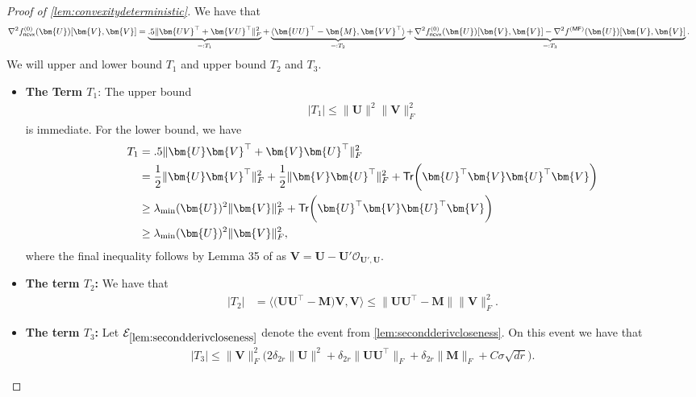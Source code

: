 \documentclass[10pt]{article}
\renewcommand{\t}{^{\top}}
\theoremstyle{definition}
\begin{document}
\begin{proof}[Proof of \cref{lem:convexitydeterministic}]
  We have that 
   \begin{align}
       \nabla^2 f^{(0)}_{{\sf ncvx}}(\bm{U})[\bm{V}, \bm{V}] &= \underbrace{ .5\| \bm{UV}\t + \bm{VU}\t \|_F^2 }_{=:T_1} + \underbrace{ \langle \bm{UU}\t - \bm{M}, \bm{VV}\t\rangle}_{=:T_2} + 
       \underbrace{\nabla^2 f^{(0)}_{{\sf ncvx}}(\bm{U})[ \bm{V},\bm{V}] - \nabla^2 f^{{(\sf MF)}}(\bm{U})[\bm{V},\bm{V}]}_{=:T_3}.
   \end{align}
We will upper and lower bound $T_1$ and upper bound $T_2$ and $T_3$.  
\begin{itemize}
    \item \textbf{The Term $T_1$}: The upper bound 
    \begin{align}
        |T_1| \leq \| \bm{U} \|^2 \| \bm{V} \|_F^2
    \end{align}
    is immediate.  For the lower bound, we have
    \begin{align}
         T_1 &= .5 \| \bm{U} \bm{V}\t + \bm{V} \bm{U}^{\top} \|_F^2 \\
        &= \frac{1}{2} \| \bm{U} \bm{V}\t \|_F^2 + \frac{1}{2} \| \bm{V} \bm{U}^{\top} \|_F^2 + {\sf Tr}\bigg( \bm{U}^{\top} \bm{V} \bm{U}^{\top} \bm{V} \bigg) \\
        &\geq \lambda_{\min}(\bm{U})^2 \| \bm{V} \|_F^2 + {\sf Tr}\bigg( \bm{U}^{\top} \bm{V} \bm{U}^{\top} \bm{V} \bigg) \\
        &\geq \lambda_{\min}(\bm{U})^2 \| \bm{V} \|_F^2,
    \end{align}
    where the final inequality follows by Lemma 35 of \citet{ma_implicit_2020} as $\bm{V} = \bm{U} - \bm{U}' \mathcal{O}_{\bm{U}',\bm{U}}$.
    \item \textbf{The term $T_2$: } We have that
    \begin{align}
        |T_2| &= \langle \big(\bm{UU}\t - \bm{M}\big) \bm{V}, \bm{V} \rangle \leq \| \bm{UU}\t - \bm{M} \| \| \bm{V} \|_F^2.
    \end{align}
     \item \textbf{The term $T_3$:} Let $\mathcal{E}_{\cref{lem:secondderivcloseness}}$ denote the event from \cref{lem:secondderivcloseness}.  On this event we have that 
\begin{align}
    | T_3 |  \leq \| \bm{V}\|_F^2 \bigg( 2 \delta_{2r} \| \bm{U} \|^2 + \delta_{2r} \| \bm{UU}\t \|_F + \delta_{2r} \| \bm{M} \|_F + C \sigma \sqrt{dr} \bigg). \label{eq:t3bound}
\end{align}
\end{itemize}

\end{proof}
\end{document}
